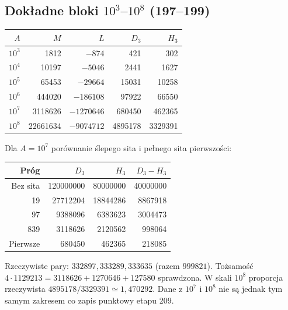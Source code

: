 \documentclass[11pt,a4paper]{article}
\theoremstyle{definition}\newtheorem{defn}[tw]{Definicja}
\theoremstyle{remark}\newtheorem*{uw}{Uwaga}
\begin{document}
\subsection{Dokładne bloki $10^3$--$10^8$ (197--199)}
\begin{center}
\begin{tabular}{rrrrr}
\toprule $A$&$M$&$L$&$D_3$&$H_3$\\\midrule
$10^3$&1812&$-874$&421&302\\
$10^4$&10197&$-5046$&2441&1627\\
$10^5$&65453&$-29664$&15031&10258\\
$10^6$&444020&$-186108$&97922&66550\\
$10^7$&3118626&$-1270646$&680450&462365\\
$10^8$&22661634&$-9074712$&4895178&3329391\\\bottomrule
\end{tabular}
\end{center}
Dla $A=10^7$ porównanie ślepego sita i pełnego sita pierwszości:
\begin{center}
\begin{tabular}{rrrr}
\toprule Próg&$D_3$&$H_3$&$D_3-H_3$\\\midrule
Bez sita&120000000&80000000&40000000\\
19&27712204&18844286&8867918\\
97&9388096&6383623&3004473\\
839&3118626&2120562&998064\\
Pierwsze&680450&462365&218085\\\bottomrule
\end{tabular}
\end{center}
Rzeczywiste pary: $332897,333289,333635$ (razem $999821$).
Tożsamość $4\cdot1129213=3118626+1270646+127580$ sprawdzona.
W skali $10^8$ proporcja rzeczywista $4895178/3329391\simeq1{,}470292$.
Dane z $10^7$ i $10^8$ nie są jednak tym samym zakresem co zapis punktowy
etapu 209.
\end{document}
